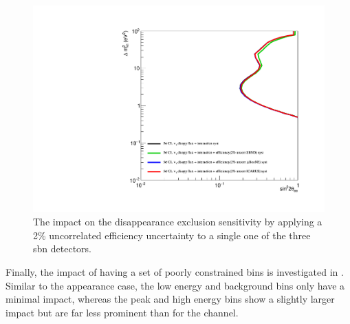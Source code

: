 \begin{figure}[h!]
    \centering
    \includegraphics[width = \largefigwidth]{figures-chap6/exclusion_contours/efficiency_systematics/nue_disapp_2pct_uncor_per_detector.pdf}
    \caption[\nue disapp with a 2\% uncorrelated efficiency systematic for one detector only.]{The impact on the \nue disappearance exclusion sensitivity by applying a 2\% uncorrelated efficiency uncertainty to a single one of the three \gls{sbn} detectors.}
    \label{fig:nue_disapp_uncorrelated_per_detector}
\end{figure}

\newpage
Finally, the impact of having a set of poorly constrained bins is investigated in . Similar to the \nue appearance case, the low energy and background bins only have a minimal impact, whereas the peak and high energy bins show a slightly larger impact but are far less prominent than for the \numu channel. 

